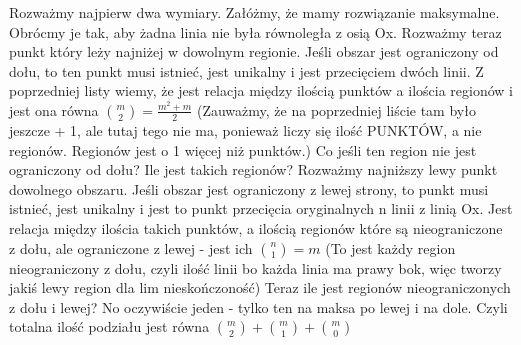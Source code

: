 \documentclass[12pt]{article}
\begin{document}
Rozważmy najpierw dwa wymiary.
Załóżmy, że mamy rozwiązanie maksymalne. Obrócmy je tak, aby żadna linia nie była równoległa z osią Ox. Rozważmy teraz punkt który leży najniżej w dowolnym regionie.
Jeśli obszar jest ograniczony od dołu, to ten punkt musi istnieć, jest unikalny i jest przecięciem dwóch linii. Z poprzedniej listy wiemy, że jest relacja między ilością punktów a ilościa regionów i jest ona równa $\binom{m}{2} = \frac{m^2+m}{2}$ (Zauważmy, że na poprzedniej liście tam było jeszcze + 1, ale tutaj tego nie ma, ponieważ liczy się ilość PUNKTÓW, a nie regionów. Regionów jest o 1 więcej niż punktów.)
Co jeśli ten region nie jest ograniczony od dołu? Ile jest takich regionów? Rozważmy najniższy lewy punkt dowolnego obszaru. Jeśli obszar jest ograniczony z lewej strony, to punkt musi istnieć, jest unikalny i jest to punkt przecięcia oryginalnych n linii z linią Ox. Jest relacja między ilościa takich punktów, a ilością regionów które są nieograniczone z dołu, ale ograniczone z lewej - jest ich $\binom{n}{1} = m$ (To jest każdy region nieograniczony z dołu, czyli ilość linii bo każda linia ma prawy bok, więc tworzy jakiś lewy region dla lim nieskończoność)
Teraz ile jest regionów nieograniczonych z dołu i lewej? No oczywiście jeden - tylko ten na maksa po lewej i na dole. Czyli totalna ilość podziału jest równa $\binom{m}{2} + \binom{m}{1} + \binom{m}{0}$
\end{document}
